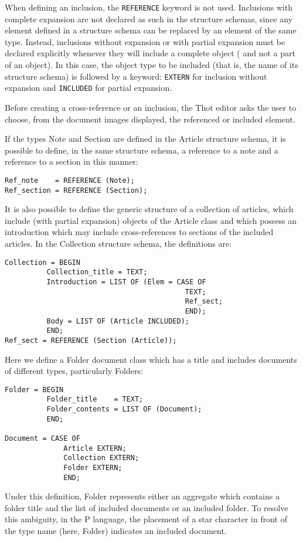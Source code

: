 When defining an inclusion, the {\tt REFERENCE} keyword is not used.
Inclusions with complete expansion are not declared as such in the
structure schemas, since any element defined in a structure schema can
be replaced by an element of the same type.  Instead, inclusions
without expansion or with partial expansion must be declared
explicitly whenever they will include a complete object ( and not a
part of an object).  In this case, the object type to be included
(that is, the name of its structure schema) is followed by a keyword:
{\tt EXTERN} for inclusion without expansion and {\tt INCLUDED} for
partial expansion.

Before creating a cross-reference or an inclusion, the Thot editor
asks the user to choose, from the document images displayed, the
referenced or included element.

\begin{example}
If the types Note and Section are defined in the
Article structure schema, it is possible to define, in the same
structure schema, a reference to a note and a reference to a section
in this manner:

\begin{verbatim}
Ref_note    = REFERENCE (Note);
Ref_section = REFERENCE (Section);
\end{verbatim}

It is also possible to define the generic structure of a collection of
articles, which include (with partial expansion) objects of the 
Article class and which possess an introduction which may include
cross-references to sections of the included articles.  In the
Collection structure schema, the definitions are:

\begin{verbatim}
Collection = BEGIN
          Collection_title = TEXT;
          Introduction = LIST OF (Elem = CASE OF
                                           TEXT;
                                           Ref_sect;
                                           END);
          Body = LIST OF (Article INCLUDED);
          END;
Ref_sect = REFERENCE (Section (Article));
\end{verbatim}

Here we define a Folder document class which has a title
and includes documents of different types, particularly Folders:

\begin{verbatim}
Folder = BEGIN
          Folder_title    = TEXT;
          Folder_contents = LIST OF (Document);
          END;

Document = CASE OF
              Article EXTERN;
              Collection EXTERN;
              Folder EXTERN;
              END;
\end{verbatim}

Under this definition, Folder represents either an aggregate which
contains a folder title and the list of included documents or an
included folder.  To resolve this ambiguity, in the P language, the
placement of a star character in front of the type name (here, Folder)
indicates an included document.
\end{example}

